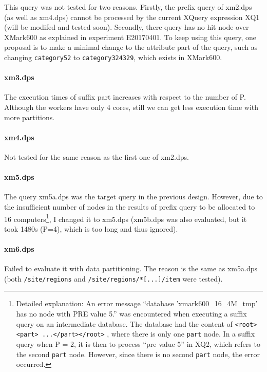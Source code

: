 This query was not tested for two reasons. Firstly, the prefix query of xm2.dps
(as well as xm4.dps) cannot be processed by the current XQuery expression XQ1
(will be modifed and tested soon). Secondly, there query has no hit node over
XMark600 as explained in experiment E20170401. To keep using this query, one
proposal is to make a minimal change to the attribute part of the query, such as
changing \texttt{category52} to \texttt{category324329}, which exists in
XMark600.


\paragraph{xm3.dps}

The execution times of suffix part increases with respect to the number of P.
Although the workers have only 4 cores, still we can get less execution time
with more partitions. 


\paragraph{xm4.dps}

Not tested for the same reason as the first one of xm2.dps.

\paragraph{xm5.dps}

The query xm5a.dps was the target query in the previous design.
However, due to the insufficient number of nodes in the results of prefix
query to be allocated to 16 computers\footnote{
	Detailed explanation: An error message
	``database 'xmark600\_16\_4M\_tmp' has no node with PRE value 5.'' was
	encountered when executing a suffix query on an intermediate database.
	The database had the content of  \texttt{<root><part> ...</part></root>} ,
	where there is only one \texttt{part} node.
	In a suffix query when P = 2, it is then to process ``pre value 5'' in XQ2,
	which refers to the second \texttt{part} node. However, since there is
	no second \texttt{part} node, the error occurred.
}, I changed it to xm5.dps (xm5b.dps was also evaluated, but
it took 1480s (P=4), which is too long and thus ignored).


\paragraph{xm6.dps}

Failed to evaluate it with data partitioning. The reason is
the same as xm5a.dps (both \texttt{/site/regions} and
\texttt{/site/regions/*[...]/item} were tested).


